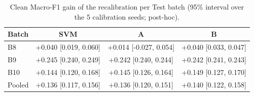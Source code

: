 \begin{table}[t]
\centering
\footnotesize
\caption{Clean Macro-F1 gain of the recalibration per Test batch (95\% interval over the 5 calibration seeds; post-hoc).}
\label{tab:v2gain}
\setlength{\tabcolsep}{3pt}
\begin{tabular}{lccc}
\toprule
Batch & SVM & A & B \\
\midrule
B8 & +0.040 [0.019, 0.060] & +0.014 [-0.027, 0.054] & +0.040 [0.033, 0.047] \\
B9 & +0.245 [0.240, 0.249] & +0.242 [0.240, 0.244] & +0.242 [0.241, 0.243] \\
B10 & +0.144 [0.120, 0.168] & +0.145 [0.126, 0.164] & +0.149 [0.127, 0.170] \\
Pooled & +0.136 [0.117, 0.156] & +0.136 [0.120, 0.151] & +0.140 [0.122, 0.158] \\
\bottomrule
\end{tabular}
\end{table}
